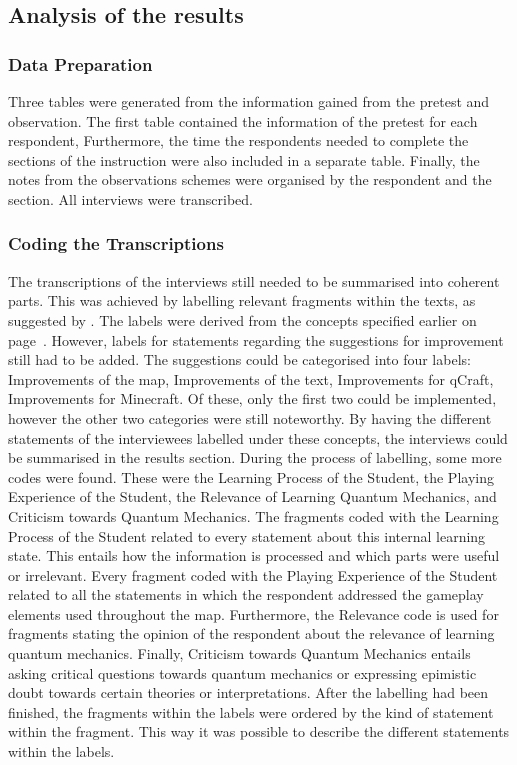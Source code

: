 \documentclass[11pt,twoside]{report} %
\begin{document}
\subsection{Analysis of the results}

\subsubsection{Data Preparation}

Three tables were generated from the information gained from the pretest and observation. The first table contained the information of the pretest for each respondent, Furthermore, the time the respondents needed to complete the sections of the instruction were also included in a separate table. Finally, the notes from the observations schemes were organised by the respondent and the section. All interviews were transcribed.

\subsubsection{Coding the Transcriptions}

The transcriptions of the interviews still needed to be summarised into coherent parts. This was achieved by labelling relevant fragments within the texts, as suggested by . The labels were derived from the concepts specified earlier on page~\pageref{sssec:evaconcepts}. However, labels for statements regarding the suggestions for improvement still had to be added. The suggestions could be categorised into four labels: Improvements of the map, Improvements of the text, Improvements for qCraft, Improvements for Minecraft. Of these, only the first two could be implemented, however the other two categories were still noteworthy. By having the different statements of the interviewees labelled under these concepts, the interviews could be summarised in the results section. During the process of labelling, some more codes were found. These were the Learning Process of the Student, the Playing Experience of the Student, the Relevance of Learning Quantum Mechanics, and Criticism towards Quantum Mechanics. The fragments coded with the Learning Process of the Student related to every statement about this internal learning state. This entails how the information is processed and which parts were useful or irrelevant. Every fragment coded with the Playing Experience of the Student related to all the statements in which the respondent addressed the gameplay elements used throughout the map. Furthermore, the Relevance code is used for fragments stating the opinion of the respondent about the relevance of learning quantum mechanics. Finally, Criticism towards Quantum Mechanics entails asking critical questions towards quantum mechanics or expressing epimistic doubt towards certain theories or interpretations. After the labelling had been finished, the fragments within the labels were ordered by the kind of statement within the fragment. This way it was possible to describe the different statements within the labels.
\end{document}
